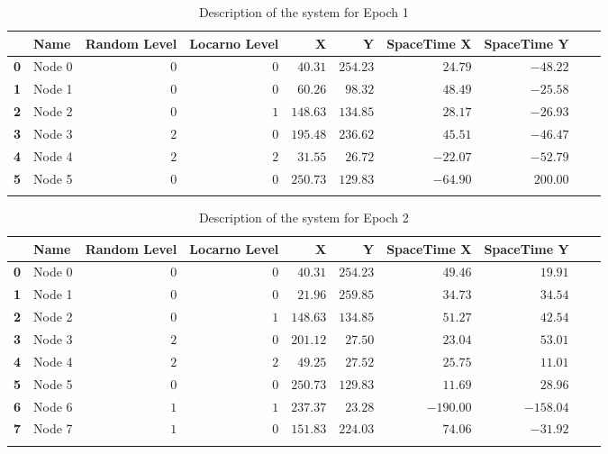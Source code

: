 \documentclass[a4paper,11pt,twoside=semi,openright]{report}
\begin{document}
\begin{table}[h]
\centering
\tiny
\begin{tabular}{@{}llrrrrrrll@{}}
\toprule
& \textbf{Name}   &\textbf{Random Level} &\textbf{Locarno Level} & \textbf{X} & \textbf{Y} & \textbf{SpaceTime X} & \textbf{SpaceTime Y}  \\ \midrule
\textbf{0} & Node 0&$0$&$0$&$40.31$&$254.23$&$24.79$&$-48.22$&\\ \hdashline
\textbf{1} & Node 1&$0$&$0$&$60.26$&$98.32$&$48.49$&$-25.58$&\\ \hdashline
\textbf{2} & Node 2&$0$&$1$&$148.63$&$134.85$&$28.17$&$-26.93$&\\ \hdashline
\textbf{3} & Node 3&$2$&$0$&$195.48$&$236.62$&$45.51$&$-46.47$&\\ \hdashline
\textbf{4} & Node 4&$2$&$2$&$31.55$&$26.72$&$-22.07$&$-52.79$&\\ \hdashline
\textbf{5} & Node 5&$0$&$0$&$250.73$&$129.83$&$-64.90$&$200.00$&\\ \hdashline\midrule
\bottomrule
\end{tabular}
\caption{Description of the system for Epoch 1}
\end{table}


\begin{table}[h]
\centering
\tiny
\begin{tabular}{@{}llrrrrrrll@{}}
\toprule
& \textbf{Name}   &\textbf{Random Level} &\textbf{Locarno Level} & \textbf{X} & \textbf{Y} & \textbf{SpaceTime X} & \textbf{SpaceTime Y}  \\ \midrule
\textbf{0} & Node 0&$0$&$0$&$40.31$&$254.23$&$49.46$&$19.91$&\\ \hdashline
\textbf{1} & Node 1&$0$&$0$&$21.96$&$259.85$&$34.73$&$34.54$&\\ \hdashline
\textbf{2} & Node 2&$0$&$1$&$148.63$&$134.85$&$51.27$&$42.54$&\\ \hdashline
\textbf{3} & Node 3&$2$&$0$&$201.12$&$27.50$&$23.04$&$53.01$&\\ \hdashline
\textbf{4} & Node 4&$2$&$2$&$49.25$&$27.52$&$25.75$&$11.01$&\\ \hdashline
\textbf{5} & Node 5&$0$&$0$&$250.73$&$129.83$&$11.69$&$28.96$&\\ \hdashline
\textbf{6} & Node 6&$1$&$1$&$237.37$&$23.28$&$-190.00$&$-158.04$&\\ \hdashline
\textbf{7} & Node 7&$1$&$0$&$151.83$&$224.03$&$74.06$&$-31.92$&\\ \hdashline\midrule
\bottomrule
\end{tabular}
\caption{Description of the system for Epoch 2}
\end{table}
\end{document}
